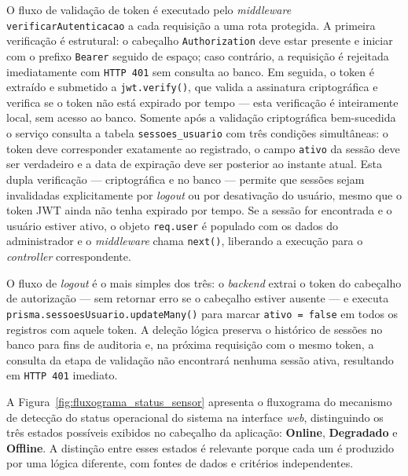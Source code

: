 O fluxo de validação de token é executado pelo
\textit{middleware} \texttt{verificarAutenticacao} a cada
requisição a uma rota protegida. A primeira verificação é
estrutural: o cabeçalho \texttt{Authorization} deve estar presente
e iniciar com o prefixo \texttt{Bearer} seguido de espaço; caso
contrário, a requisição é rejeitada imediatamente com
\texttt{HTTP 401} sem consulta ao banco. Em seguida, o token é
extraído e submetido a \texttt{jwt.verify()}, que valida a
assinatura criptográfica e verifica se o token não está expirado
por tempo --- esta verificação é inteiramente local, sem acesso ao
banco. Somente após a validação criptográfica bem-sucedida o
serviço consulta a tabela \texttt{sessoes\_usuario} com três
condições simultâneas: o token deve corresponder exatamente ao
registrado, o campo \texttt{ativo} da sessão deve ser verdadeiro
e a data de expiração deve ser posterior ao instante atual. Esta
dupla verificação --- criptográfica e no banco --- permite que
sessões sejam invalidadas explicitamente por \textit{logout} ou
por desativação do usuário, mesmo que o token JWT ainda não
tenha expirado por tempo. Se a sessão for encontrada e o usuário
estiver ativo, o objeto \texttt{req.user} é populado com os dados
do administrador e o \textit{middleware} chama \texttt{next()},
liberando a execução para o \textit{controller} correspondente.

O fluxo de \textit{logout} é o mais simples dos três: o
\textit{backend} extrai o token do cabeçalho de autorização ---
sem retornar erro se o cabeçalho estiver ausente --- e executa
\texttt{prisma.sessoesUsuario.updateMany()} para marcar
\texttt{ativo = false} em todos os registros com aquele token.
A deleção lógica preserva o histórico de sessões no banco para
fins de auditoria e, na próxima requisição com o mesmo token,
a consulta da etapa de validação não encontrará nenhuma sessão
ativa, resultando em \texttt{HTTP 401} imediato.

\label{subsubsec:fluxograma-status-sensor}

A Figura~\ref{fig:fluxograma_status_sensor} apresenta o fluxograma
do mecanismo de detecção do status operacional do sistema na
interface \textit{web}, distinguindo os três estados possíveis
exibidos no cabeçalho da aplicação: \textbf{Online},
\textbf{Degradado} e \textbf{Offline}. A distinção entre esses
estados é relevante porque cada um é produzido por uma lógica
diferente, com fontes de dados e critérios independentes.

